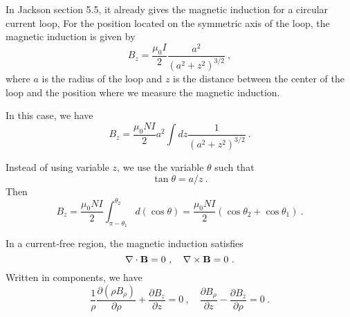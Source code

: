 \documentclass[12pt]{article}
\newcommand{\B}{{\bf B}}
\begin{document}
\newpage
{} In Jackson section 5.5, it already gives the magnetic induction for a circular current loop,
For the position located on the symmetric axis of the loop, the magnetic induction is given by
\begin{equation}
    B_z = \frac{\mu_0 I}{2} \frac{a^2}{(a^2 + z^2)^{3/2}}~,
\end{equation}
where $a$ is the radius of the loop and $z$ is the distance between the center of the loop and the position where we measure the magnetic induction.

In this case, we have
\begin{equation}
    B_z  = \frac{\mu_0 N I}{2} a^2 \int dz  \frac{1}{(a^2 + z^2)^{3/2}}~.
\end{equation}

Instead of using variable $z$, we use the variable $\theta$ such that
\begin{equation}
    \tan \theta = a/z~.
\end{equation}
Then
\begin{equation}
    \boxed{
    B_z = \frac{\mu_0 N I}{2} \int_{\pi - \theta_1}^{\theta_2} d(\cos \theta) = \frac{\mu_0 N I}{2} (\cos \theta_2 + \cos \theta_1)~.
    }
\end{equation}

\newpage
{} In a current-free region, the magnetic induction satisfies
\begin{equation}
    \nabla \cdot \B = 0~, \quad \nabla \times \B = 0~.
\end{equation}
Written in components, we have
\begin{equation}\label{eqn:constraints}
    \frac{1}{\rho} \frac{\partial (\rho B_\rho)}{\partial \rho} + \frac{\partial B_z}{\partial z} = 0~, \quad \frac{\partial B_\rho}{\partial z} - \frac{\partial B_z}{\partial \rho} = 0~.
\end{equation}
\end{document}
